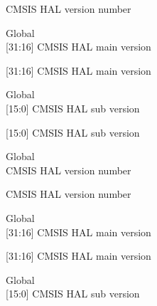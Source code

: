 \begin{DoxyRefList}
\label{deprecated__deprecated000911}%
%
CMSIS HAL version number  
\item[Global \doxylink{_core_2_include_2core__cm0_8h_acd01bf0a654a7f15f606593aa636bc72}{\+\_\+\+\_\+\+CM0\+\_\+\+CMSIS\+\_\+\+VERSION\+\_\+\+MAIN} ]\hfill \\
\label{deprecated__deprecated000231}%
%
\mbox{[}31\+:16\mbox{]} CMSIS HAL main version 

\label{deprecated__deprecated000909}%
%
\mbox{[}31\+:16\mbox{]} CMSIS HAL main version  
\item[Global \doxylink{_core_2_include_2core__cm0_8h_ab6a85b0d3b2fbcfb62003006ece175cc}{\+\_\+\+\_\+\+CM0\+\_\+\+CMSIS\+\_\+\+VERSION\+\_\+\+SUB} ]\hfill \\
\label{deprecated__deprecated000232}%
%
\mbox{[}15\+:0\mbox{]} CMSIS HAL sub version 

\label{deprecated__deprecated000910}%
%
\mbox{[}15\+:0\mbox{]} CMSIS HAL sub version  
\item[Global \doxylink{_core_2_include_2core__cm0plus_8h_afbc98e5d6904c90236f737adb89af711}{\+\_\+\+\_\+\+CM0\+PLUS\+\_\+\+CMSIS\+\_\+\+VERSION} ]\hfill \\
\label{deprecated__deprecated000236}%
%
CMSIS HAL version number 

\label{deprecated__deprecated000914}%
%
CMSIS HAL version number  
\item[Global \doxylink{_core_2_include_2core__cm0plus_8h_a31329dc8c47fc34ca3cacbfd4c66a19a}{\+\_\+\+\_\+\+CM0\+PLUS\+\_\+\+CMSIS\+\_\+\+VERSION\+\_\+\+MAIN} ]\hfill \\
\label{deprecated__deprecated000234}%
%
\mbox{[}31\+:16\mbox{]} CMSIS HAL main version 

\label{deprecated__deprecated000912}%
%
\mbox{[}31\+:16\mbox{]} CMSIS HAL main version  
\item[Global \doxylink{_core_2_include_2core__cm0plus_8h_a70604168ca42eff80802c151188a59d1}{\+\_\+\+\_\+\+CM0\+PLUS\+\_\+\+CMSIS\+\_\+\+VERSION\+\_\+\+SUB} ]\hfill \\
\label{deprecated__deprecated000235}%
%
\mbox{[}15\+:0\mbox{]} CMSIS HAL sub version 


\end{DoxyRefList}
